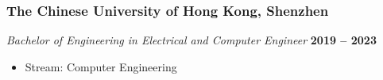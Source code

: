 \documentclass[10pt,a4paper]{article}
\begin{document}
    \subsubsection*{\color{itemcolor}The Chinese University of Hong Kong, Shenzhen}
    \textit{\color{graytext}Bachelor of Engineering in Electrical and Computer Engineer} \hfill \color{accentcolor}\textbf{2019 – 2023} \\
    \begin{itemize}[leftmargin=*, label=\textcolor{accentcolor}{\textbullet}]
        \vspace{-1em}
        \item \small{\color{graytext}Stream: Computer Engineering}
    \end{itemize}
\vspace{0.8em}

\end{document}
